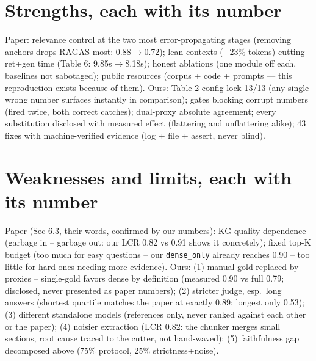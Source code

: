 \documentclass[12pt,a4paper]{article}
\begin{document}
\section{Strengths, each with its number}
Paper: relevance control at the two most error-propagating stages (removing
anchors drops RAGAS most: 0.88$\rightarrow$0.72); lean contexts ($-$23\%
tokens) cutting ret+gen time (Table 6: 9.85s$\rightarrow$8.18s); honest
ablations (one module off each, baselines not sabotaged); public resources
(corpus + code + prompts --- this reproduction exists because of them).
Ours: Table-2 config lock 13/13 (any single wrong number surfaces instantly
in comparison); gates blocking corrupt numbers (fired twice, both correct
catches); dual-proxy absolute agreement; every substitution disclosed with
measured effect (flattering and unflattering alike); 43 fixes with
machine-verified evidence (log + file + assert, never blind).

\section{Weaknesses and limits, each with its number}
Paper (Sec 6.3, their words, confirmed by our numbers): KG-quality dependence
(garbage in -- garbage out: our LCR 0.82 vs 0.91 shows it concretely);
fixed top-K budget (too much for easy questions -- our \texttt{dense\_only}
already reaches 0.90 -- too little for hard ones needing more evidence).
Ours: (1) manual gold replaced by proxies -- single-gold favors dense by
definition (measured 0.90 vs full 0.79; disclosed, never presented as paper
numbers); (2) stricter judge, esp.\ long answers (shortest quartile matches
the paper at exactly 0.89; longest only 0.53); (3) different standalone models
(references only, never ranked against each other or the paper); (4) noisier
extraction (LCR 0.82: the chunker merges small sections, root cause traced to
the cutter, not hand-waved); (5) faithfulness gap decomposed above (75\%
protocol, 25\% strictness+noise).

\end{document}
